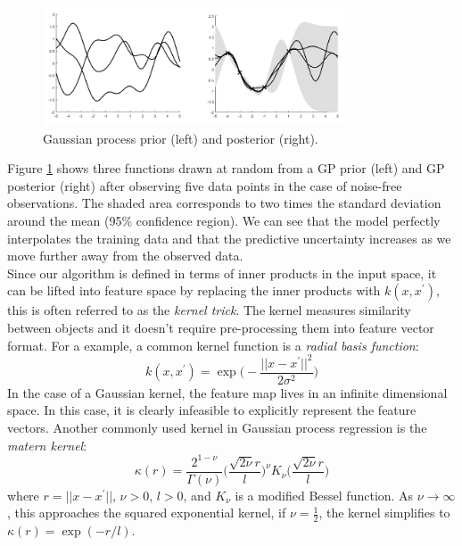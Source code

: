 \begin{figure}[tbhp]
    \centering
    \includegraphics[width=0.8\textwidth, trim={10 10 10 10}]{figures/gp12.png}
    \caption{Gaussian process prior (left) and posterior (right).}
    \label{fig:gp12}
\end{figure}

Figure \ref{fig:gp12} shows three functions drawn at random from a GP prior (left) and GP posterior (right) after observing five data points in the case of noise-free observations. The shaded area corresponds to two times the standard deviation around the mean (95\% confidence region). We can see that the model perfectly interpolates the training data and that the predictive uncertainty increases as we move further away from the observed data.\\

Since our algorithm is defined in terms of inner products in the input space, it can be lifted into feature space by replacing the inner products with $k(x,x^{\prime})$, this is often referred to as the \textit{kernel trick}. The kernel measures similarity between objects and it doesn't require pre-processing them into feature vector format. For a example, a common kernel function is a \textit{radial basis function}:
\begin{equation}
    k(x,x^{\prime}) = \exp\bigg(-\frac{||x-x^{\prime}||^{2}}{2\sigma^2} \bigg)
\end{equation}
In the case of a Gaussian kernel, the feature map lives in an infinite dimensional space. In this case, it is clearly infeasible to explicitly represent the feature vectors. Another commonly used kernel in Gaussian process regression is the \textit{matern kernel}:
\begin{equation}
    \kappa(r) = \frac{2^{1-\nu}}{\Gamma(\nu)}\bigg(\frac{\sqrt{2\nu}r}{l}\bigg)^{\nu}K_{\nu}\bigg(\frac{\sqrt{2\nu}r}{l}\bigg)   
\end{equation}
where $r=||x-x^{\prime}||$, $\nu > 0$, $l > 0$, and $K_{\nu}$ is a modified Bessel function. As $\nu \rightarrow \infty$, this approaches the squared exponential kernel, if $\nu = \frac{1}{2}$, the kernel simplifies to $\kappa(r) = \exp(-r/l)$.\\

